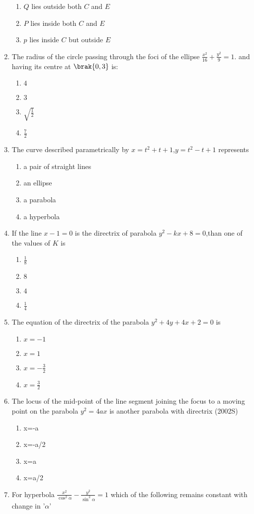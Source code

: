 \begin{enumerate}
\begin{enumerate}
    \item $Q$ lies outside both $C$ and $E$
    \item $P$ lies inside both $C$ and $E$
    \item $p$ lies inside $C$ but outside $E$ 
\end{enumerate}
\item The radius of the circle passing through the foci of the ellipse $\frac{x^2}{16}+\frac{y^2}{9}=1$. and having its centre at $\brak{0,3}$ is:
       \hfill {}
\begin{enumerate}
    \item $4$
    \item $3$
    \item $\sqrt{\frac{1}{2}}$
    \item $\frac{7}{2}$
\end{enumerate}
\item The curve described parametrically by $x=t^2+t+1$,$y=t^2-t+1$ represents
     \hfill{}
\begin{enumerate}
    \item a pair of straight lines
    \item an ellipse
    \item a parabola
    \item a hyperbola
\end{enumerate}
\item If the line $x-1=0$ is the directrix of parabola $y^2-kx+8=0$,than one of the values of $K$ is
      \hfill{}
\begin{enumerate}
    \item $\frac{1}{8}$
    \item $8$
    \item $4$
    \item $\frac{1}{4}$ 
\end{enumerate}
    \item The equation of the directrix of the parabola $y^2+4y+4x+2=0$ is 
     \hfill {}
\begin{enumerate}
    \item $x=-1$
    \item $x=1$
    \item $x=-\frac{3}{2}$
     \item $x=\frac{3}{2}$
\end{enumerate}
\item The locus of the mid-point of the line segment joining the focus to a moving point on the parabola $y^{2} = 4ax$ is another parabola with directrix \hfill{(2002S)}
\begin{multicols}{4}
 \begin{enumerate}
    \item x=-a
    \item x=-a/2
    \item x=a
    \item x=a/2
 \end{enumerate}
\end{multicols}
\item For hyperbola $\frac{x^{2}}{\cos^{2}\alpha}-\frac{y^{2}}{\sin^{2}\alpha}=1$ which of the following remains constant with change in '$\alpha$'


\end{enumerate}
